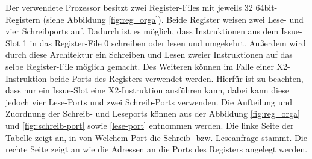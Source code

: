 %			
Der verwendete Prozessor besitzt zwei Register-Files mit jeweils 32 64bit-Registern (siehe Abbildung \ref{fig:reg_orga}). Beide Register weisen zwei Lese- und vier Schreibports auf. Dadurch ist es möglich, dass Instruktionen aus dem Issue-Slot 1 in das Register-File 0 schreiben oder lesen und umgekehrt. Außerdem wird durch diese Architektur ein Schreiben und Lesen zweier Instruktionen auf das selbe Register-File möglich gemacht. Des Weiteren können im Falle einer X2-Instruktion beide Ports des Registers verwendet werden. Hierfür ist zu beachten, dass nur ein Issue-Slot eine X2-Instruktion ausführen kann, dabei kann diese jedoch vier Lese-Ports und zwei Schreib-Ports verwenden. Die Aufteilung und  Zuordnung der Schreib- und Leseports können aus der Abbildung \ref{fig:reg_orga} und \ref{fig::schreib-port} sowie \ref{lese-port} entnommen werden. Die linke Seite der Tabelle zeigt an, in von Welchem Port die Schreib- bzw. Leseanfrage stammt. Die rechte Seite zeigt an wie die Adressen an die Ports des Registers angelegt werden.

\newpage

